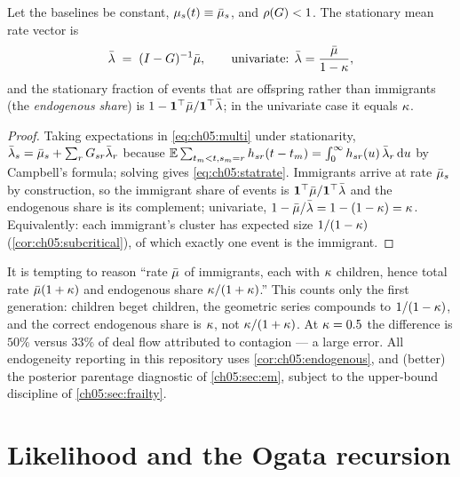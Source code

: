 \begin{corollary}\label{cor:ch05:endogenous}
Let the baselines be constant, $\mu_s(t) \equiv \bar{\mu}_s$, and
$\rho\!\left(G\right) < 1$. The stationary mean rate vector is
\begin{equation}\label{eq:ch05:statrate}
\bar{\lambda} \;=\; (I - G)^{-1} \bar{\mu},
\qquad\text{univariate: } \bar{\lambda} = \frac{\bar{\mu}}{1 - \kappa},
\end{equation}
and the stationary fraction of events that are offspring rather than
immigrants (the \emph{endogenous share}) is $1 - \mathbf{1}^\top\bar{\mu} /
\mathbf{1}^\top\bar{\lambda}$; in the univariate case it equals $\kappa$.
\end{corollary}

\begin{proof}
Taking expectations in \cref{eq:ch05:multi} under stationarity,
$\bar{\lambda}_s = \bar{\mu}_s + \sum_r G_{sr}\bar{\lambda}_r$ because
$\mathbb{E} \sum_{t_m<t, s_m=r} h_{sr}(t-t_m) = \int_0^\infty
h_{sr}(u)\, \bar{\lambda}_r \,\mathrm{d} u$ by Campbell's formula; solving gives
\cref{eq:ch05:statrate}. Immigrants arrive at rate $\bar{\mu}_s$ by
construction, so the immigrant share of events is
$\mathbf{1}^\top\bar{\mu}/\mathbf{1}^\top\bar{\lambda}$ and the endogenous share
is its complement; univariate, $1 - \bar{\mu}/\bar{\lambda} = 1 - (1-\kappa) =
\kappa$. Equivalently: each immigrant's cluster has expected size
$1/(1-\kappa)$ (\cref{cor:ch05:subcritical}), of which exactly one event
is the immigrant.
\end{proof}

\begin{remark}\label{rem:ch05:accounting}
It is tempting to reason ``rate $\bar{\mu}$ of immigrants, each with
$\kappa$ children, hence total rate $\bar{\mu}(1+\kappa)$ and endogenous
share $\kappa/(1+\kappa)$.'' This counts only the first generation:
children beget children, the geometric series compounds to
$1/(1-\kappa)$, and the correct endogenous share is $\kappa$, not
$\kappa/(1+\kappa)$. At $\kappa = 0.5$ the difference is $50\%$ versus
$33\%$ of deal flow attributed to contagion --- a large error.
All endogeneity reporting in this repository uses
\cref{cor:ch05:endogenous}, and (better) the posterior parentage
diagnostic of \cref{ch05:sec:em}, subject to the upper-bound discipline of
\cref{ch05:sec:frailty}.
\end{remark}

\section{Likelihood and the Ogata recursion}\label{ch05:sec:likelihood}

